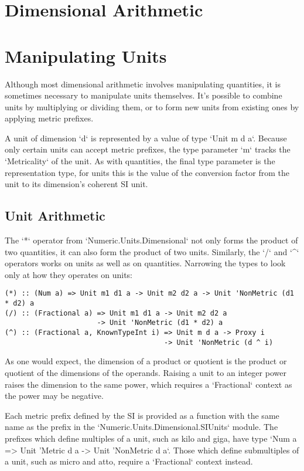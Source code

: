 \documentclass[11pt]{report}
\begin{document}
\chapter{Dimensional Arithmetic}

\chapter{Manipulating Units}

Although most dimensional arithmetic involves manipulating quantities, it is sometimes necessary
to manipulate units themselves. It's possible to combine units by multiplying or dividing them, or to
form new units from existing ones by applying metric prefixes.

A unit of dimension `d` is represented by a value of type `Unit m d a`. Because only certain units can
accept metric prefixes, the type parameter `m` tracks the `Metricality` of the unit. As with quantities,
the final type parameter is the representation type, for units this is the value of the conversion factor
from the unit to its dimension's coherent SI unit.

\section{Unit Arithmetic}

The `*` operator from `Numeric.Units.Dimensional` not only forms the product of two quantities, it can also
form the product of two units. Similarly, the `/` and `^` operators works on units as well as on quantities.
Narrowing the types to look only at how they operates on units:

\begin{lstlisting}
(*) :: (Num a) => Unit m1 d1 a -> Unit m2 d2 a -> Unit 'NonMetric (d1 * d2) a
(/) :: (Fractional a) => Unit m1 d1 a -> Unit m2 d2 a
                      -> Unit 'NonMetric (d1 * d2) a
(^) :: (Fractional a, KnownTypeInt i) => Unit m d a -> Proxy i
                                      -> Unit 'NonMetric (d ^ i) 
\end{lstlisting}

As one would expect, the dimension of a product or quotient is the product or quotient of the dimensions of the operands.
Raising a unit to an integer power raises the dimension to the same power, which requires a `Fractional` context as the
power may be negative.

Each metric prefix defined by the SI is provided as a function with the same name as the prefix in the `Numeric.Units.Dimensional.SIUnits` module.
The prefixes which define multiples of a unit, such as kilo and giga, have type `Num a => Unit 'Metric d a -> Unit 'NonMetric d a`.
Those which define submultiples of a unit, such as micro and atto, require a `Fractional` context instead.
\end{document}
